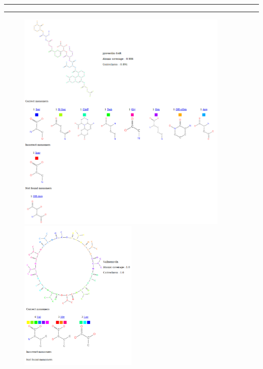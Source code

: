 \documentclass[11pt, a4paper]{report}
\begin{document}
	\pagebreak
	
	\vspace{900px}
	
	\rule{1\textwidth}{.8pt}
	\rule{1\textwidth}{.8pt}
	
	\begin{figure}[H]
		\centering
		\includegraphics[width=0.9\textwidth]{images/pyoverdin G4R.png}
		\hspace{2cm}
		\includegraphics[width=0.5\textwidth]{images/Valinomycin.png}
	\end{figure}
	
\end{document}
